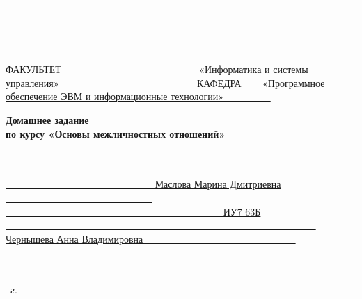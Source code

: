 \begin{titlepage}
    \noindent
	\rule{17cm}{3pt}
    \\
    \begin{spacing}{0.1}
        ~\\
    \end{spacing}
	\noindent ФАКУЛЬТЕТ
    \uline
    {
            ~~~~~~~~~~~~~~~~~~~~~~~~~~~
            «Информатика и системы управления»
            ~~~~~~~~~~~~~~~~~~~~~~~~~~~
    }
    \newline\newline
	\noindent КАФЕДРА
    \uline{
            ~~~
            «Программное обеспечение ЭВМ и информационные технологии»
            ~~~~~~~~~
        }
    \newline\newline
    \newline\newline
    \newline\newline
    \newline\newline
    \newline

    \fontsize{18pt}{18pt}\selectfont
	\begin{center}
        \textbf{Домашнее задание}\\
        \textbf{по курсу «Основы межличностных отношений»}\\
        ~\\
        \fontsize{16pt}{16pt}\selectfont
	\end{center}
    ~\\

	\fontsize{14pt}{14pt}\selectfont
	\noindent{}
    \uline{
        ~~~~~~~~~~~~~~~~~~~~~~~~~~~~~~
        Маслова Марина Дмитриевна
        ~~~~~~~~~~~~~~~~~~~~~~~~~~~~~~
    }
    \newline\newline
	\noindent{}
    \uline{
        ~~~~~~~~~~~~~~~~~~~~~~~~~~~~~~~~~~~~~~~~~~~~
        ИУ7-63Б
        ~~~~~~~~~~~~~~~~~~~~~~~~~~~~~~~~~~~~~~~~~~~~
    }
    \newline\newline
	\noindent{}
    \uline{
        ~~~~~~~~~~~~~~~~~~~
        Чернышева Анна Владимировна
        ~~~~~~~~~~~~~~~~~~~~~~~~~~~~~~
    }
    \newline\newline
    \newline\newline
    ~\\
    ~\\
    ~\\
    \vspace{17mm}

	\begin{center}
        \textit{\the\year~г.}
	\end{center}

    \restoregeometry
\end{titlepage}
